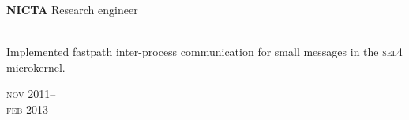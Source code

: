 

\begin{minipage}[t]{0.75\textwidth}
\textbf{NICTA}\phantom{..} Research engineer \\
{\small
\\
Implemented fastpath inter-process communication for small messages in the \textsc{sel4} microkernel.\\
\par
}
\end{minipage}
\begin{minipage}[t]{0.25\textwidth}
{
\hfill \textsc{nov} 2011--\\ 
\hspace*{0pt} \hfill \textsc{feb} 2013
\par
}
\end{minipage}






